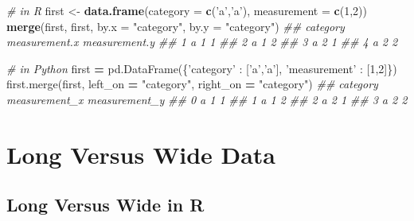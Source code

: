 \documentclass[12pt,krantz2]{krantz}
\makeatletter
\newenvironment{Shaded}{\begin{snugshade}}{\end{snugshade}}
\newcommand{\CommentTok}[1]{\textcolor[rgb]{0.37,0.37,0.37}{\textit{#1}}}
\newcommand{\DataTypeTok}[1]{\textcolor[rgb]{0.27,0.27,0.27}{#1}}
\newcommand{\DecValTok}[1]{\textcolor[rgb]{0.06,0.06,0.06}{#1}}
\newcommand{\KeywordTok}[1]{\textcolor[rgb]{0.27,0.27,0.27}{\textbf{#1}}}
\newcommand{\NormalTok}[1]{#1}
\newcommand{\OperatorTok}[1]{\textcolor[rgb]{0.43,0.43,0.43}{\textbf{#1}}}
\newcommand{\StringTok}[1]{\textcolor[rgb]{0.5,0.5,0.5}{#1}}
\newenvironment{kframe}{%
\medskip{}
\setlength{\fboxsep}{.8em}
 \def\at@end@of@kframe{}%
 \ifinner\ifhmode%
  \def\at@end@of@kframe{\end{minipage}}%
  \begin{minipage}{\columnwidth}%
 \fi\fi%
 \def\FrameCommand##1{\hskip\@totalleftmargin \hskip-\fboxsep
 \colorbox{shadecolor}{##1}\hskip-\fboxsep
     \hskip-\linewidth \hskip-\@totalleftmargin \hskip\columnwidth}%
 \MakeFramed {\advance\hsize-\width
   \@totalleftmargin\z@ \linewidth\hsize
   \@setminipage}}%
 {\par\unskip\endMakeFramed%
 \at@end@of@kframe}
\renewenvironment{Shaded}{\begin{kframe}}{\end{kframe}}
\makeatother
\begin{document}
\begin{Shaded}
\begin{Highlighting}[]
\CommentTok{# in R}
\NormalTok{first <-}\StringTok{ }\KeywordTok{data.frame}\NormalTok{(}\DataTypeTok{category =} \KeywordTok{c}\NormalTok{(}\StringTok{'a'}\NormalTok{,}\StringTok{'a'}\NormalTok{), }\DataTypeTok{measurement =} \KeywordTok{c}\NormalTok{(}\DecValTok{1}\NormalTok{,}\DecValTok{2}\NormalTok{))}
\KeywordTok{merge}\NormalTok{(first, first, }\DataTypeTok{by.x =} \StringTok{"category"}\NormalTok{, }\DataTypeTok{by.y =} \StringTok{"category"}\NormalTok{)}
\CommentTok{##   category measurement.x measurement.y}
\CommentTok{## 1        a             1             1}
\CommentTok{## 2        a             1             2}
\CommentTok{## 3        a             2             1}
\CommentTok{## 4        a             2             2}
\end{Highlighting}
\end{Shaded}

\begin{Shaded}
\begin{Highlighting}[]
\CommentTok{# in Python}
\NormalTok{first }\OperatorTok{=}\NormalTok{ pd.DataFrame(\{}\StringTok{'category'}\NormalTok{ : [}\StringTok{'a'}\NormalTok{,}\StringTok{'a'}\NormalTok{], }\StringTok{'measurement'}\NormalTok{ : [}\DecValTok{1}\NormalTok{,}\DecValTok{2}\NormalTok{]\})}
\NormalTok{first.merge(first, left_on }\OperatorTok{=} \StringTok{"category"}\NormalTok{, right_on }\OperatorTok{=} \StringTok{"category"}\NormalTok{)}
\CommentTok{##   category  measurement_x  measurement_y}
\CommentTok{## 0        a              1              1}
\CommentTok{## 1        a              1              2}
\CommentTok{## 2        a              2              1}
\CommentTok{## 3        a              2              2}
\end{Highlighting}
\end{Shaded}

\hypertarget{long-versus-wide-data}{%
\section{Long Versus Wide Data}\label{long-versus-wide-data}}

\hypertarget{long-versus-wide-in-r}{%
\subsection{Long Versus Wide in R}\label{long-versus-wide-in-r}}
\end{document}
